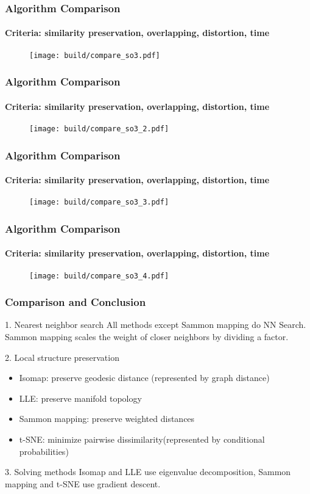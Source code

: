 \documentclass{beamer}
\begin{document}
\begin{frame}
  \frametitle{Algorithm Comparison}
  \framesubtitle{Criteria: similarity preservation, overlapping, distortion, time}
  \begin{figure}
    \centering
    \texttt{[image: build/compare\_so3.pdf]}
  \end{figure}
\end{frame}
\begin{frame}
  \frametitle{Algorithm Comparison}
  \framesubtitle{Criteria: similarity preservation, overlapping, distortion, time}
  \begin{figure}
    \centering
    \texttt{[image: build/compare\_so3\_2.pdf]}
  \end{figure}
\end{frame}
\begin{frame}
  \frametitle{Algorithm Comparison}
  \framesubtitle{Criteria: similarity preservation, overlapping, distortion, time}
  \begin{figure}
    \centering
    \texttt{[image: build/compare\_so3\_3.pdf]}
  \end{figure}
\end{frame}
\begin{frame}
  \frametitle{Algorithm Comparison}
  \framesubtitle{Criteria: similarity preservation, overlapping, distortion, time}
  \begin{figure}
    \centering
    \texttt{[image: build/compare\_so3\_4.pdf]}
  \end{figure}
\end{frame}

% 
% 
% 
% 
% 
%
\begin{frame}
  \frametitle{Comparison and Conclusion}

  \begin{block}{1. Nearest neighbor search}
    All methods except Sammon mapping do NN Search. Sammon mapping scales the weight of closer neighbors by dividing a factor.
  \end{block}

  \begin{block}{2. Local structure preservation}
    \begin{itemize}
      \item Isomap: preserve geodesic distance (represented by graph distance)
      \item LLE: preserve manifold topology
      \item Sammon mapping: preserve weighted distances 
      \item t-SNE: minimize pairwise dissimilarity(represented by conditional probabilities)
    \end{itemize}
  \end{block}

  \begin{block}{3. Solving methods}
    Isomap and LLE use eigenvalue decomposition, Sammon mapping and t-SNE use gradient descent.
  \end{block}
    
\end{frame}
\end{document}
